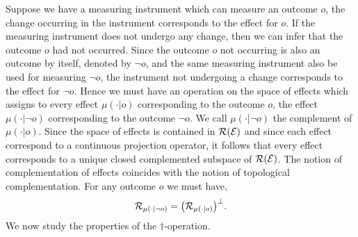 \documentclass[11pt]{article}
\begin{document}
Suppose we have a measuring instrument which can measure an outcome $o$, the change occurring in the instrument corresponds to the effect for $o$. If the measuring instrument does not undergo any change, then we can infer that the outcome $o$ had not occurred. Since the outcome $o$ not occurring is also an outcome by itself, denoted by $\neg o$, and the same measuring instrument also be used for measuring $\neg o$, the instrument not undergoing a change corresponds to the effect for $\neg o$. Hence we must have an operation on the space of effects which assigns to every effect $\mu(\cdot|o)$ corresponding to the outcome $o$, the effect $\mu(\cdot|{\neg o})$ corresponding to the outcome $\neg o$. We call $\mu(\cdot|{\neg o})$ the complement of $\mu(\cdot|o)$. Since the space of effects is contained in $\mathcal{R}(\mathcal{E})$ and since each effect correspond to a continuous projection operator, it follows that every effect corresponds to a unique closed complemented subspace of $\mathcal{R}(\mathcal{E})$. The notion of complementation of effects coincides with the notion of topological complementation. For any outcome $o$ we must have,
\[\mathcal{R}_{\mu(\cdot|\neg o)}=\big(\mathcal{R}_{\mu(\cdot|o)}\big)^\perp.\]
We now study the properties of the $\dagger$-operation.
\end{document}
